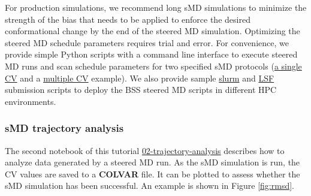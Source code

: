 For production simulations, we recommend long sMD simulations to minimize the strength of the bias that needs to be applied to enforce the desired conformational change by the end of the steered MD simulation. Optimizing the steered MD schedule parameters requires trial and error. 
For convenience, we provide simple Python scripts with a command line interface to execute steered MD runs and scan schedule parameters for two specified sMD protocols (\href{https://github.com/OpenBioSim/biosimspace_tutorials/blob/main/03_steered_md/scripts/sMD_simple.py}{a single CV} and a \href{https://github.com/OpenBioSim/biosimspace_tutorials/blob/main/03_steered_md/scripts/sMD_multiCV.py}{multiple CV} example). We also provide sample \href{https://github.com/OpenBioSim/biosimspace_tutorials/blob/main/03_steered_md/scripts/sMD_slurm.sh}{slurm} and \href{https://github.com/OpenBioSim/biosimspace_tutorials/blob/main/03_steered_md/scripts/sMD_LSF.sh}{LSF} submission scripts to deploy the BSS steered MD scripts in different HPC environments. 

\subsubsection{sMD trajectory analysis}

The second notebook of this tutorial \href{https://github.com/OpenBioSim/biosimspace_tutorials/blob/main/03_steered_md/02_trajectory_analysis.ipynb}{02-trajectory-analysis} describes how to analyze data generated by a steered MD run. As the sMD simulation is run, the CV values are saved to a \textbf{COLVAR} file. It can be plotted to assess whether the sMD simulation has been successful. An example is shown in Figure \ref{fig:rmsd}.

